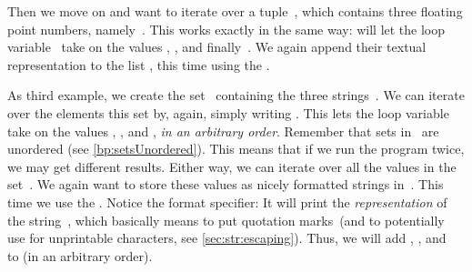 Then we move on and want to iterate over a tuple~, which contains three floating point numbers, namely~.
This works exactly in the same way:
 will let the loop variable~ take on the values , , and finally~.
We again append their textual representation to the list , this time using the  .

As third example, we create the set~ containing the three strings~.
We can iterate over the elements this set by, again, simply writing .
This lets the loop variable~ take on the values , , and , \emph{in an arbitrary order}.
Remember that sets in \python\ are unordered (see \cref{bp:setsUnordered}).
This means that if we run the program twice, we may get different results.
Either way, we can iterate over all the values in the set~.
We again want to store these values as nicely formatted strings in~.
This time we use the  .
Notice the  format specifier:
It will print the \emph{representation} of the string~, which basically means to put quotation marks~(and to potentially use  for unprintable characters, see \cref{sec:str:escaping}).
Thus, we will add , , and~ to  (in an arbitrary order).

